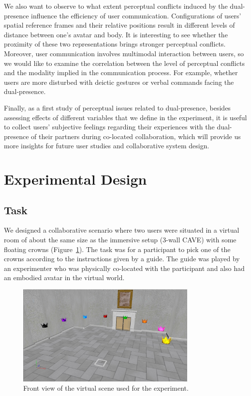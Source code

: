 We also want to observe to what extent perceptual conflicts induced by the dual-presence influence the efficiency of user communication. Configurations of users' spatial reference frames and their relative positions result in different levels of distance between one's avatar and body. It is interesting to see whether the proximity of these two representations brings stronger perceptual conflicts. Moreover, user communication involves multimodal interaction between users, so we would like to examine the correlation between the level of perceptual conflicts and the modality implied in the communication process. For example, whether users are more disturbed with deictic gestures or verbal commands facing the dual-presence.

Finally, as a first study of perceptual issues related to dual-presence, besides assessing effects of different variables that we define in the experiment, it is useful to collect users' subjective feelings regarding their experiences with the dual-presence of their partners during co-located collaboration, which will provide us more insights for future user studies and collaborative system design.  


\section{Experimental Design}

\subsection{Task}
We designed a collaborative scenario where two users were situated in a virtual room of about the same size as the immersive setup (3-wall CAVE) with some floating crowns (Figure~\ref{fig:3_virtual_room}). The task was for a participant to pick one of the crowns according to the instructions given by a guide. The guide was played by an experimenter who was physically co-located with the participant and also had an embodied avatar in the virtual world.

\begin{figure}[htb]
  \centering
  \includegraphics[width=0.8\textwidth]{figures/ch3/virtual_room}
  \caption{\label{fig:3_virtual_room}Front view of the virtual scene used for the experiment.}
\end{figure}

